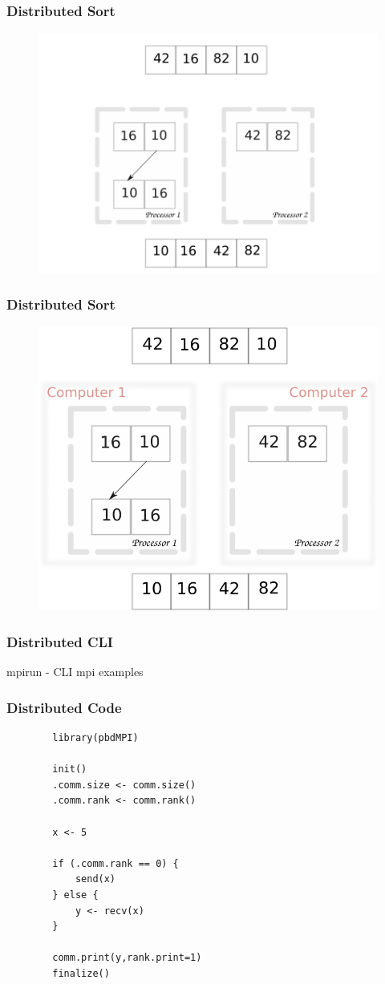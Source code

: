 
\begin{frame}
		\frametitle{Distributed Sort}
		\begin{figure}
				\includegraphics[width=0.8\linewidth]{figures/diagrams/sort/parallelsort}
		\end{figure}
\end{frame}

\begin{frame}
		\frametitle{Distributed Sort}
		\begin{figure}
			\includegraphics[width=0.7\linewidth]{figures/diagrams/sort/distributedsort}
		\end{figure}
\end{frame}

\begin{frame}
		\frametitle{Distributed CLI}
		mpirun - CLI mpi examples
\end{frame}

\begin{frame}[fragile]
		\frametitle{Distributed Code}
		\begin{verbatim}
		library(pbdMPI)

		init()
		.comm.size <- comm.size()
		.comm.rank <- comm.rank()

		x <- 5

		if (.comm.rank == 0) {
		    send(x)
		} else {
		    y <- recv(x)
		}

		comm.print(y,rank.print=1)
		finalize()
		\end{verbatim}
\end{frame}

